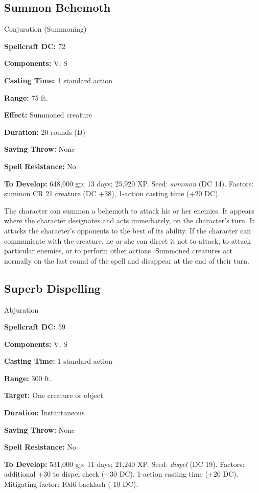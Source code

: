 \documentclass{article}
\begin{document}
\vspace{12pt}
\subsection*{Summon Behemoth }

Conjuration (Summoning) 

\textbf{Spellcraft DC:} 72 

\textbf{Components:} V, S 

\textbf{Casting Time:} 1 standard action 

\textbf{Range:} 75 ft. 

\textbf{Effect:} Summoned creature 

\textbf{Duration:} 20 rounds (D) 

\textbf{Saving Throw:} None 

\textbf{Spell Resistance:} No 

\textbf{To Develop:} 648,000 gp; 13 days; 25,920 XP. Seed: \textit{summon }(DC 
14). Factors: summon CR 21 creature (DC +38), 1-action casting time (+20 DC). 

The character can summon a behemoth to attack his or her enemies. It appears where 
the character designates and acts immediately, on the character's turn. It attacks 
the character's opponents to the best of its ability. If the character can communicate 
with the creature, he or she can direct it not to attack, to attack particular 
enemies, or to perform other actions. Summoned creatures act normally on the last 
round of the spell and disappear at the end of their turn. 

\vspace{12pt}
\subsection*{Superb Dispelling }

Abjuration 

\textbf{Spellcraft DC:} 59 

\textbf{Components:} V, S 

\textbf{Casting Time:} 1 standard action 

\textbf{Range:} 300 ft. 

\textbf{Target:} One creature or object 

\textbf{Duration:} Instantaneous 

\textbf{Saving Throw:} None 

\textbf{Spell Resistance:} No 

\textbf{To Develop:} 531,000 gp; 11 days; 21,240 XP. Seed: \textit{dispel }(DC 
19). Factors: additional +30 to dispel check (+30 DC), 1-action casting time (+20 
DC). Mitigating factor: 10d6 backlash (-10 DC). 
\end{document}
